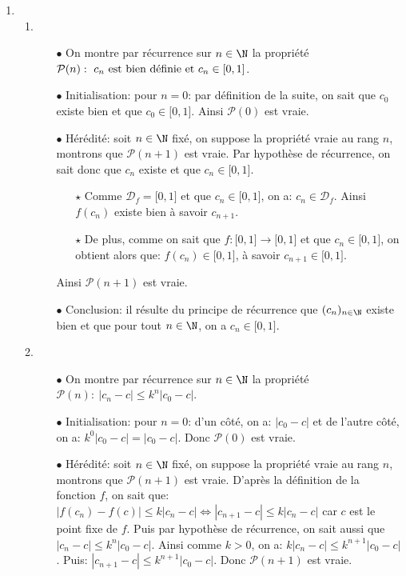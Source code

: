 \documentclass[a4paper, 11pt,reqno]{article}
\begin{document}
\begin{correction}
\begin{enumerate}
\item
\begin{enumerate}
\item 
\begin{itemize}
\item[$\bullet$] On montre par r\'ecurrence sur $n\in\N$ la propri\'et\'e $\mathcal{P}(n):\ c_n\ \hbox{est bien d\'efinie et}\ c_n\in\lbrack 0,1\rbrack$. 
\item[$\bullet$] Initialisation: pour $n=0$: par d\'efinition de la suite, on sait que $c_0$ existe bien et que $c_0\in\lbrack 0,1\rbrack$. Ainsi $\mathcal{P}(0)$ est vraie. 
\item[$\bullet$] H\'er\'edit\'e: soit $n\in\N$ fix\'e, on suppose la propri\'et\'e vraie au rang $n$, montrons que $\mathcal{P}(n+1)$ est vraie. Par hypoth\`{e}se de r\'ecurrence, on sait donc que $c_n$ existe et que $c_n\in\lbrack 0,1\rbrack$.
\begin{itemize}
\item[$\star$] Comme $\mathcal{D}_f=\lbrack 0,1\rbrack$ et que $c_n\in\lbrack 0,1\rbrack$, on a: $c_n\in\mathcal{D}_f$. Ainsi $f(c_n)$ existe bien \`{a} savoir $c_{n+1}$.
\item[$\star$] De plus, comme on sait que $f: \lbrack 0,1\rbrack\rightarrow \lbrack 0,1\rbrack$ et que $c_n\in\lbrack 0,1\rbrack$, on obtient alors que: $f(c_n)\in\lbrack 0,1\rbrack$, \`{a} savoir $c_{n+1}\in\lbrack 0,1\rbrack$.
\end{itemize}
Ainsi $\mathcal{P}(n+1)$ est vraie.
\item[$\bullet$] Conclusion: il r\'esulte du principe de r\'ecurrence que $(c_n)_{n\in\N}$ existe bien et que pour tout $n\in\N$, on a $c_n\in\lbrack 0,1\rbrack$.
\end{itemize}
\item
\begin{itemize}
\item[$\bullet$] On montre par r\'ecurrence sur $n\in\N$ la propri\'et\'e $\mathcal{P}(n):\ |c_n-c|\leq k^n |c_0-c|$.
\item[$\bullet$] Initialisation: pour $n=0$: d'un c\^{o}t\'e, on a: $|c_0-c|$ et de l'autre c\^{o}t\'e, on a: $k^0|c_0-c|=|c_0-c|$. Donc $\mathcal{P}(0)$ est vraie.
\item[$\bullet$] H\'er\'edit\'e: soit $n\in\N$ fix\'e, on suppose la propri\'et\'e vraie au rang $n$, montrons que $\mathcal{P}(n+1)$ est vraie. D'apr\`{e}s la d\'efinition de la fonction $f$, on sait que: $|f(c_n)-f(c)|\leq k|c_n-c|\Leftrightarrow |c_{n+1}-c|\leq k|c_n-c|$ car $c$ est le point fixe de $f$. Puis par hypoth\`{e}se de r\'ecurrence, on sait aussi que $|c_n-c|\leq k^n |c_0-c|$. Ainsi comme $k>0$, on a: $k|c_n-c|\leq k^{n+1}|c_0-c|$. Puis: $|c_{n+1}-c|\leq k^{n+1}|c_0-c|$. Donc $\mathcal{P}(n+1)$ est vraie.

\end{itemize}
\end{enumerate}
\end{enumerate}
\end{correction}
\end{document}
